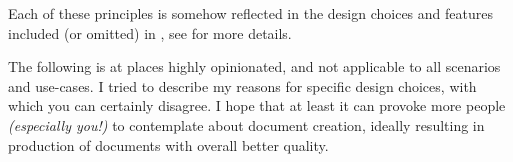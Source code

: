Each of these principles is somehow reflected in the design choices and features included (or omitted) in \TeXtured{}, see  for more details.

\begin{remark}[Disclaimer]
    The following is at places highly opinionated, and not applicable to all scenarios and use-cases.
    I tried to describe my reasons for specific design choices, with which you can certainly disagree.
    I hope that at least it can provoke more people \emph{(especially you!)} to contemplate about document creation, ideally resulting in production of documents with overall better quality.
\end{remark}
